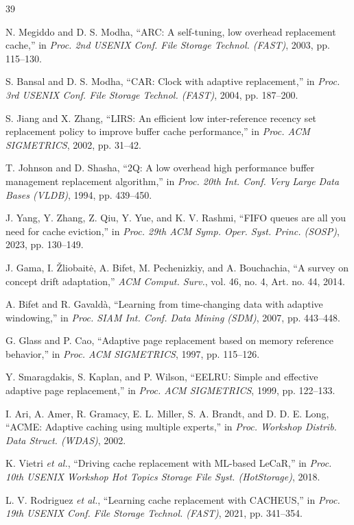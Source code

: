 \documentclass[10pt,twocolumn,a4paper]{IEEEtran}
\begin{document}
\begin{thebibliography}{39}

 N. Megiddo and D. S. Modha, ``ARC: A self-tuning, low overhead
replacement cache,'' in \emph{Proc. 2nd USENIX Conf. File Storage Technol.
(FAST)}, 2003, pp. 115--130.

 S. Bansal and D. S. Modha, ``CAR: Clock with adaptive
replacement,'' in \emph{Proc. 3rd USENIX Conf. File Storage Technol. (FAST)},
2004, pp. 187--200.

 S. Jiang and X. Zhang, ``LIRS: An efficient low inter-reference
recency set replacement policy to improve buffer cache performance,'' in
\emph{Proc. ACM SIGMETRICS}, 2002, pp. 31--42.

 T. Johnson and D. Shasha, ``2Q: A low overhead high performance
buffer management replacement algorithm,'' in \emph{Proc. 20th Int. Conf. Very
Large Data Bases (VLDB)}, 1994, pp. 439--450.

 J. Yang, Y. Zhang, Z. Qiu, Y. Yue, and K. V. Rashmi, ``FIFO
queues are all you need for cache eviction,'' in \emph{Proc. 29th ACM Symp.
Oper. Syst. Princ. (SOSP)}, 2023, pp. 130--149.

 J. Gama, I. \v{Z}liobait\.{e}, A. Bifet, M. Pechenizkiy, and A.
Bouchachia, ``A survey on concept drift adaptation,'' \emph{ACM Comput.
Surv.}, vol. 46, no. 4, Art. no. 44, 2014.

 A. Bifet and R. Gavald\`a, ``Learning from time-changing data
with adaptive windowing,'' in \emph{Proc. SIAM Int. Conf. Data Mining (SDM)},
2007, pp. 443--448.

 G. Glass and P. Cao, ``Adaptive page replacement based on memory
reference behavior,'' in \emph{Proc. ACM SIGMETRICS}, 1997, pp. 115--126.

 Y. Smaragdakis, S. Kaplan, and P. Wilson, ``EELRU: Simple and
effective adaptive page replacement,'' in \emph{Proc. ACM SIGMETRICS}, 1999,
pp. 122--133.

 I. Ari, A. Amer, R. Gramacy, E. L. Miller, S. A. Brandt, and D.
D. E. Long, ``ACME: Adaptive caching using multiple experts,'' in \emph{Proc.
Workshop Distrib. Data Struct. (WDAS)}, 2002.

 K. Vietri \emph{et al.}, ``Driving cache replacement with
ML-based LeCaR,'' in \emph{Proc. 10th USENIX Workshop Hot Topics Storage File
Syst. (HotStorage)}, 2018.

 L. V. Rodriguez \emph{et al.}, ``Learning cache replacement
with CACHEUS,'' in \emph{Proc. 19th USENIX Conf. File Storage Technol. (FAST)},
2021, pp. 341--354.


\end{thebibliography}
\end{document}
